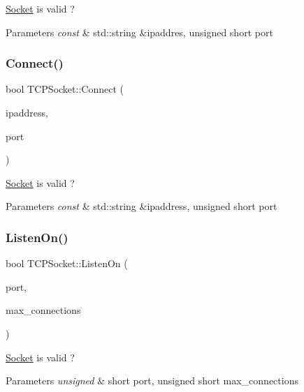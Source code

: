 \hyperlink{class_socket}{Socket} is valid ? 


\begin{DoxyParams}{Parameters}
{\em const} & std\+::string \&ipaddres, unsigned short port \\
\hline
\end{DoxyParams}
\mbox{\label{class_t_c_p_socket_ac816c30175550d8d9a14c89c1c5ec8da}} 
\subsubsection{\texorpdfstring{Connect()}{Connect()}}
{\footnotesize\ttfamily bool T\+C\+P\+Socket\+::\+Connect (\begin{DoxyParamCaption}\item[{const std\+::string \&}]{ipaddress,  }\item[{unsigned short}]{port }\end{DoxyParamCaption})}



\hyperlink{class_socket}{Socket} is valid ? 


\begin{DoxyParams}{Parameters}
{\em const} & std\+::string \&ipaddress, unsigned short port \\
\hline
\end{DoxyParams}
\mbox{\label{class_t_c_p_socket_aef6184730320c1336600f6cab1546a38}} 
\subsubsection{\texorpdfstring{Listen\+On()}{ListenOn()}}
{\footnotesize\ttfamily bool T\+C\+P\+Socket\+::\+Listen\+On (\begin{DoxyParamCaption}\item[{unsigned short}]{port,  }\item[{unsigned short}]{max\+\_\+connections }\end{DoxyParamCaption})}



\hyperlink{class_socket}{Socket} is valid ? 


\begin{DoxyParams}{Parameters}
{\em unsigned} & short port, unsigned short max\+\_\+connections \\
\hline
\end{DoxyParams}
\mbox{\label{class_t_c_p_socket_a45e9155a64fb9dca84aee4967a719aff}} 
